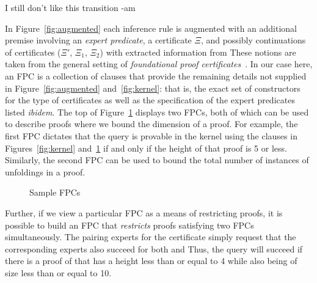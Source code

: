 \begin{metanote}
  I still don't like this transition -am
\end{metanote}
In Figure~\ref{fig:augmented}  each
inference rule is augmented with an additional premise involving an
\emph{expert predicate}, a certificate $\Xi$, and possibly continuations of
certificates ($\Xi'$, $\Xi_1$, $\Xi_2$) with extracted information from
These notions are taken from the general setting of \emph{foundational
  proof certificates}~\cite{chihani17jar}.
%
In our case here, an FPC is a collection of \lP clauses that
provide the remaining details not supplied in Figure~\ref{fig:augmented} and~\ref{fig:kernel}:
that is, the exact set of constructors for the  type of certificates as
well as the specification of the expert predicates listed \emph{ibidem}.
%
The top of Figure~\ref{fig:resources} displays two FPCs,
both of which can be used to describe proofs where we bound
the dimension of  a proof.
%
For example, the first FPC dictates that the query \mbox{} is
provable in  the kernel using the clauses in Figures~\ref{fig:kernel}
and~\ref{fig:resources} if and only if the height of that proof is 5
or less.
%
Similarly, the second FPC can be used to bound the total number of instances of
unfoldings in a proof.
%

\begin{figure}[t]


\caption{Sample FPCs}
\label{fig:resources}
\end{figure}

Further, if we view a particular FPC as a means of restricting proofs, it is
possible to build an FPC that \emph{restricts} proofs satisfying two FPCs
simultaneously.
%
%
The pairing experts for the certificate  simply
request that the corresponding experts also succeed for both
 and  
%
Thus, the query 
will succeed if there is a proof of  that has a height less
than or equal to 4 while also being of size less than or equal to 10.

